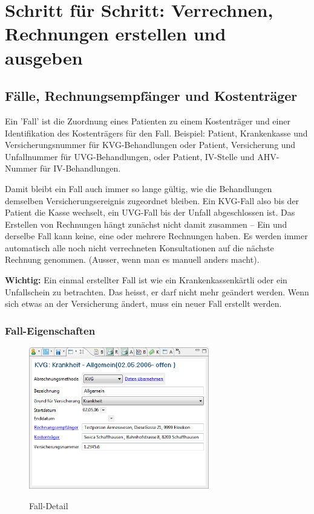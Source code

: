 \documentclass[a4paper]{scrartcl}
\begin{document}
\section{Schritt für Schritt: Verrechnen, Rechnungen erstellen und ausgeben}
\label{rechnungenerstellen}
\subsection{Fälle, Rechnungsempfänger und Kostenträger}
Ein 'Fall' ist die Zuordnung eines Patienten zu einem Kostenträger und einer Identifikation des Kostenträgers für den Fall. Beispiel: Patient, Krankenkasse und Versicherungsnummer für KVG-Behandlungen oder Patient, Versicherung und Unfallnummer für UVG-Behandlungen, oder Patient, IV-Stelle und AHV-Nummer für IV-Behandlungen.

\medskip

Damit bleibt ein Fall auch immer so lange gültig, wie die Behandlungen demselben Versicherungsereignis zugeordnet bleiben. Ein KVG-Fall also bis der Patient die Kasse wechselt, ein UVG-Fall bis der Unfall abgeschlossen ist. Das Erstellen von Rechnungen hängt zunächst nicht damit zusammen -- Ein und derselbe Fall kann keine, eine oder mehrere Rechnungen haben. Es werden immer automatisch alle noch nicht verrechneten Konsultationen auf die nächste Rechnung genommen. (Ausser, wenn man es manuell anders macht).

\medskip

\textbf{Wichtig:} Ein einmal erstellter Fall ist wie ein Krankenkassenkärtli oder ein Unfallschein zu betrachten. Das heisst, er darf nicht mehr geändert werden. Wenn sich etwas an der Versicherung ändert, muss ein neuer Fall erstellt werden.

\subsubsection{Fall-Eigenschaften}
\label{fall-erfordernisse}
\begin{figure}
  \includegraphics[width=0.7\textwidth]{abr8}\\
  \caption{Fall-Detail}\label{fig:abr8}
\end{figure}
\end{document}
